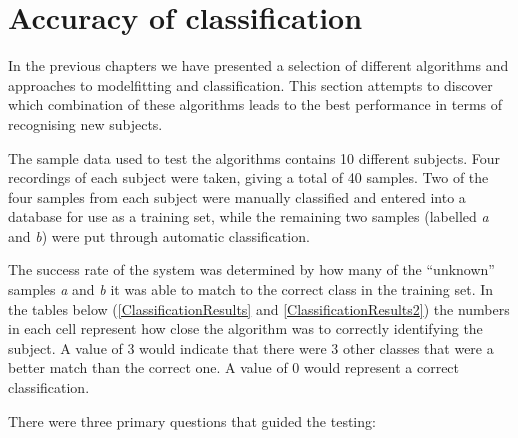 \section{Accuracy of classification}

In the previous chapters we have presented a selection of different algorithms and approaches to modelfitting and classification.
This section attempts to discover which combination of these algorithms leads to the best performance in terms of recognising new subjects.

The sample data used to test the algorithms contains 10 different subjects.
Four recordings of each subject were taken, giving a total of 40 samples.
Two of the four samples from each subject were manually classified and entered into a database for use as a training set,
while the remaining two samples (labelled \emph{a} and \emph{b}) were put through automatic classification.

The success rate of the system was determined by how many of the ``unknown'' samples \emph{a} and \emph{b} it was able to match to the correct class in the training set.
In the tables below (\ref{ClassificationResults} and \ref{ClassificationResults2}) the numbers in each cell represent how close the algorithm was to correctly identifying the subject.
A value of 3 would indicate that there were 3 other classes that were a better match than the correct one.
A value of 0 would represent a correct classification.

\bigskip
\noindent There were three primary questions that guided the testing:


